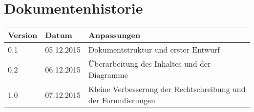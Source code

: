 \section*{Dokumentenhistorie}
\begin{tabularx}{\linewidth}{|l|r|X|} \hline
Version & \multicolumn{1}{l|}{Datum} 			& Anpassungen \\ \hline
0.1 & 05.12.2015 & Dokumentstruktur und erster Entwurf \\ \hline
0.2 & 06.12.2015 & Überarbeitung des Inhaltes und der Diagramme \\ \hline
1.0 & 07.12.2015 & Kleine Verbesserung der Rechtschreibung und der Formulierungen \\ \hline
\end{tabularx}

\clearpage
